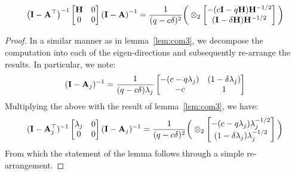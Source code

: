 \begin{lemma}\label{lem:com1}
	\begin{align*}
			{\left(\mathbf{I}- \mathbf{A}^{\top}\right)}^{-1} \begin{bmatrix}
		\mathbf{H} & 0 \\ 0 & 0
		\end{bmatrix} {\left(\mathbf{I}- \mathbf{A}\right)}^{-1} = \frac{1}{(q-c\delta)^2}\bigg(\otimes_2\begin{bmatrix} -(c\mathbf{I}-q\mathbf{H})\mathbf{H}^{-1/2}\\(\mathbf{I}-\delta\mathbf{H})\mathbf{H}^{-1/2}\end{bmatrix}\bigg)
	\end{align*}
\end{lemma}
\begin{proof}

In a similar manner as in lemma~\ref{lem:com3}, we decompose the computation into each of the eigen-directions and subsequently re-arrange the results. In particular, we note:
\begin{align*}
(\mathbf{I}-\mathbf{A}_j)^{-1}=\frac{1}{(q-c\delta)\lambda_j}\begin{bmatrix}-(c-q\lambda_j)&(1-\delta\lambda_j)\\-c&1\end{bmatrix}
\end{align*}
Multiplying the above with the result of lemma~\ref{lem:com3}, we have:
\begin{align*}
(\mathbf{I}-\mathbf{A}_j^{\top})^{-1}\begin{bmatrix}\lambda_j&0\\0&0\end{bmatrix}(\mathbf{I}-\mathbf{A}_j)^{-1}=\frac{1}{(q-c\delta)^2}\bigg(\otimes_{2}\begin{bmatrix}-(c-q\lambda_j)\lambda_j^{-1/2}\\(1-\delta\lambda_j)\lambda_j^{-1/2}\end{bmatrix}\bigg)
\end{align*}
From which the statement of the lemma follows through a simple re-arrangement.

\end{proof}

